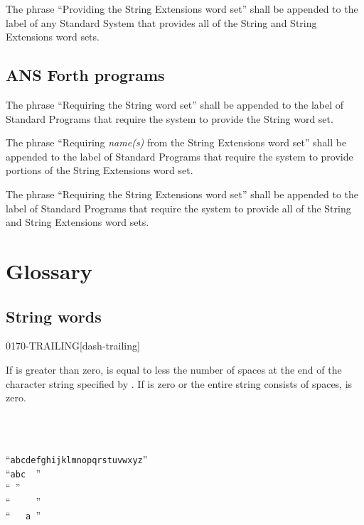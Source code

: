 The phrase ``Providing the String Extensions word set'' shall be
appended to the label of any Standard System that provides all of
the String and String Extensions word sets.

\cbstart{}
\subsection[Forth programs]{ANS Forth programs} %
\cbend

The phrase ``Requiring the String word set'' shall be appended to
the label of Standard Programs that require the system to provide
the String word set.

The phrase ``Requiring \emph{name(s)} from the String Extensions
word set'' shall be appended to the label of Standard Programs that
require the system to provide portions of the String Extensions
word set.

The phrase ``Requiring the String Extensions word set'' shall be
appended to the label of Standard Programs that require the system
to provide all of the String and String Extensions word sets.


\section{Glossary} %

\subsection{String words} %


\begin{worddef}{0170}{-TRAILING}[dash-trailing]
\item {}

	If  is greater than zero,  is equal to
	 less the number of spaces at the end of the
	character string specified by . If 
	is zero or the entire string consists of spaces,  is
	zero.

	\begin{testing}
		 \\
		 \\

				\tab {} ``\texttt{abcdefghijklmnopqrstuvwxyz}'' \\
		 			\tab[2.5]  ``\texttt{abc~~}'' \\
							\tab[5.2]  ``\texttt{~}'' \\
			\tab[1]  ``\texttt{~~~~~}'' \\
						\tab[2.8]  ``\texttt{~~~a~}''
	\end{testing}
\end{worddef}


